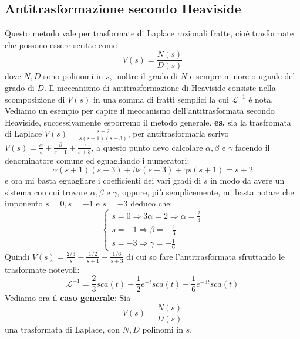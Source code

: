\subsection{Antitrasformazione secondo Heaviside}
Questo metodo vale per trasformate di Laplace razionali fratte, cioè trasformate che possono essere scritte come
\[
    V(s) = \frac{N(s)}{D(s)}
\] dove $N, D$ sono polinomi in $s$, inoltre il grado di $N$ e sempre minore o uguale del grado di $D$.\newline
\newline
Il meccanismo di antitrasformazione di Heaviside consiste nella scomposizione di $V(s)$ in una somma di fratti semplici la cui $\mathcal{L}^{-1}$ è nota.\newline
\newline
Vediamo un esempio per capire il meccanismo dell'antitrasformata secondo Heaviside, successivamente esporremo il metodo generale.\newline
\newline
\textbf{es.} sia la trasfromata di Laplace $V(s) = \frac{s+2}{s(s+1)(s+3)}$, per antitrasformarla scrivo $V(s) = \frac{\alpha}{s} + \frac{\beta}{s+1} + \frac{\gamma}{s+3}$, a questo punto devo calcolare $\alpha, \beta$ e $\gamma$ facendo il denominatore comune ed eguagliando i numeratori:
\[
    \alpha(s+1)(s+3) + \beta s(s+3) + \gamma s (s+1) = s+2
\]
e ora mi basta eguagliare i coefficienti dei vari gradi di $s$ in modo da avere un sistema con cui trovare $\alpha, \beta$ e $\gamma$, oppure, più semplicemente, mi basta notare che imponento $s=0, s=-1$ e $s=-3$ deduco che:
\[
    \begin{cases}
        s=0 \Rightarrow 3 \alpha = 2 \Rightarrow  \alpha = \frac{2}{3}\\
        s = -1 \Rightarrow \beta = - \frac{1}{3}\\
        s = -3 \Rightarrow \gamma = - \frac{1}{6}
    \end{cases}
\]
Quindi $V(s) = \frac{2/3}{s} - \frac{1/2}{s+1} - \frac{1/6}{s+3}$ di cui so fare l'antitrasformata sfruttando le trasformate notevoli:
\[
    \mathcal{L}^{-1} = \frac{2}{3}sca(t) - \frac{1}{2}e^{-t}sca(t) - \frac{1}{6}e^{-3t}sca(t)
\]
\newline
\newline
\newline
\newline
Vediamo ora il \textbf{caso generale}:\newline
Sia
\[
    V(s) = \frac{N(s)}{D(s)}
\]
una trasformata di Laplace, con $N,D$ polinomi in $s$.\newline
